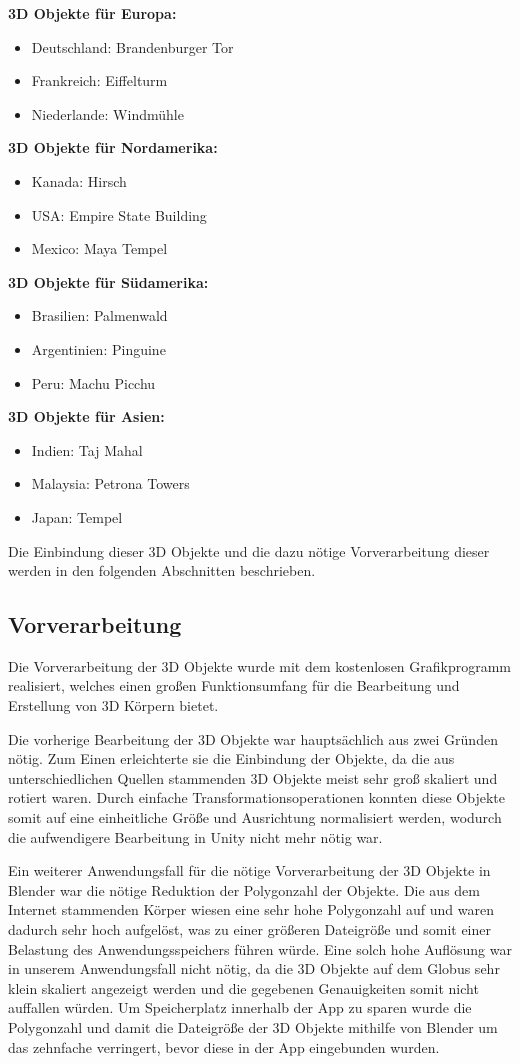 \textbf{3D Objekte für Europa:}
\begin{itemize}
\item Deutschland: Brandenburger Tor	
\item Frankreich: Eiffelturm
\item Niederlande: Windmühle
\end{itemize}

\textbf{3D Objekte für Nordamerika:}
\begin{itemize}
\item Kanada: Hirsch
\item USA: Empire State Building
\item Mexico: Maya Tempel
\end{itemize}

\textbf{3D Objekte für Südamerika:}
\begin{itemize}
\item Brasilien: Palmenwald
\item Argentinien: Pinguine
\item Peru: Machu Picchu
\end{itemize}

\textbf{3D Objekte für Asien:}
\begin{itemize}
\item Indien: Taj Mahal
\item Malaysia: Petrona Towers
\item Japan: Tempel
\end{itemize}

Die Einbindung dieser 3D Objekte und die dazu nötige Vorverarbeitung dieser werden in den folgenden Abschnitten beschrieben.
\subsection{Vorverarbeitung}
Die Vorverarbeitung der 3D Objekte wurde mit dem kostenlosen Grafikprogramm  realisiert, welches einen großen Funktionsumfang für die Bearbeitung und Erstellung von 3D Körpern bietet. 

Die vorherige Bearbeitung der 3D Objekte war hauptsächlich aus zwei Gründen nötig. 
Zum Einen erleichterte sie die Einbindung der Objekte, da die aus unterschiedlichen Quellen stammenden 3D Objekte meist sehr groß skaliert und rotiert waren.
Durch einfache Transformationsoperationen konnten diese Objekte somit auf eine einheitliche Größe und Ausrichtung normalisiert werden, wodurch die aufwendigere Bearbeitung in Unity nicht mehr nötig war.

Ein weiterer Anwendungsfall für die nötige Vorverarbeitung der 3D Objekte in Blender war die nötige Reduktion der Polygonzahl der Objekte. 
Die aus dem Internet stammenden Körper wiesen eine sehr hohe Polygonzahl auf und waren dadurch sehr hoch aufgelöst, was zu einer größeren Dateigröße und somit einer Belastung des Anwendungsspeichers führen würde. 
Eine solch hohe Auflösung war in unserem Anwendungsfall nicht nötig, da die 3D Objekte auf dem Globus sehr klein skaliert angezeigt werden und die gegebenen Genauigkeiten somit nicht auffallen würden. 
Um Speicherplatz innerhalb der App zu sparen wurde die Polygonzahl und damit die Dateigröße der 3D Objekte mithilfe von Blender um das zehnfache verringert, bevor diese in der App eingebunden wurden.

